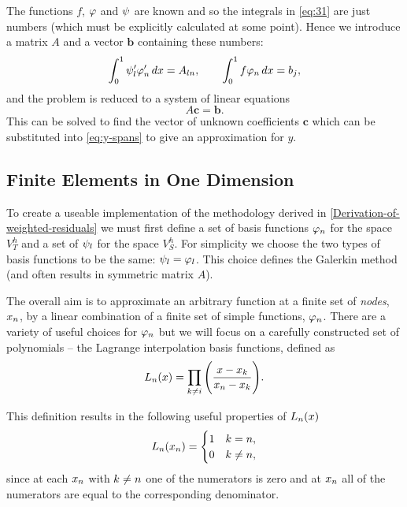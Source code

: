 The functions $f$, $\varphi$ and $\psi$ are known and so the integrals in \eqref{eq:31} are just numbers (which must be explicitly calculated at some point). Hence we introduce a matrix $A$ and a vector $\mathbf{b}$ containing these numbers:
\begin{equation}
  \int_{0}^{1}\psi_{l}'\varphi'_{n}\, dx=A_{ln},\qquad\int_{0}^{1}f\varphi_{n}\, dx=b_{j},\label{eq:Aij_bj}
\end{equation}
and the problem is reduced to a system of linear equations
\begin{equation}
  A\mathbf{c} = \mathbf{b}.
  \label{eq:final_galerkin}
\end{equation}
This can be solved to find the vector of unknown coefficients $\mathbf{c}$ which can be substituted into \eqref{eq:y-spans} to give an approximation for $y$.


\subsection{Finite Elements in One Dimension}
\label{sub:Actual-Finite-Elements}

To create a useable implementation of the methodology derived in \autoref{Derivation-of-weighted-residuals} we must first define a set of basis functions $\varphi_n$ for the space $V_{T}^{h}$ and a set of $\psi_l$ for the space $V_S^h$. For simplicity we choose the two types of basis functions to be the same: $\psi_l = \varphi_l$. This choice defines the Galerkin method (and often results in symmetric matrix $A$).\cite[215]{Zeinkiewicz1967}


The overall aim is to approximate an arbitrary function at a finite set of \emph{nodes}, $x_n$, by a linear combination of a finite set of simple functions, $\varphi_n$. There are a variety of useful choices for $\varphi_n$ but we will focus on a carefully constructed set of polynomials -- the Lagrange interpolation basis functions, defined as
\begin{equation*}
  L_n(x)=\prod_{k\neq i}\Bigg(\dfrac{x-x_{k}}{x_n-x_{k}}\Bigg).
\end{equation*}

This definition results in the following useful properties of $L_{n}(x)$
\begin{equation}
  \label{eq:35}
  L_{n}(x_{n}) =
  \begin{cases}
    1 & k = n, \\
    0 & k \neq n,
  \end{cases}
\end{equation}
since at each $x_{n}$ with $k \neq n$ one of the numerators is zero and at
$x_{n}$ all of the numerators are equal to the corresponding denominator.

